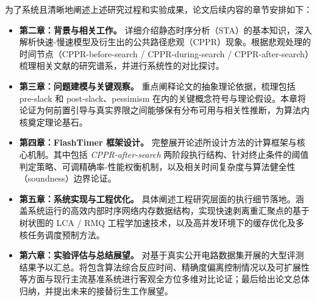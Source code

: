 为了系统且清晰地阐述上述研究过程和实验成果，论文后续内容的章节安排如下：
\begin{itemize}
    \item \textbf{第二章：背景与相关工作。} 详细介绍静态时序分析（STA）的基本知识，深入解析快速-慢速模型及衍生出的公共路径悲观（CPPR）现象。根据悲观处理的时间节点（CPPR-before-search / CPPR-during-search / CPPR-after-search）梳理相关文献的研究谱系，并进行系统性的对比探讨。
    \item \textbf{第三章：问题建模与关键观察。} 重点阐释论文的抽象理论依据，梳理包括 pre-slack 和 post-slack、pessimism 在内的关键概念符号与理论假设。本章将论证为何前置引导与真实界限之间能够保有分布可用与相关性推断，为算法内核奠定理论基石。
    \item \textbf{第四章：FlashTimer 框架设计。} 完整展开论述所设计方法的计算框架与核心机制。其中包括 \textit{CPPR-after-search} 两阶段执行结构、针对终止条件的阈值判定策略、可调精确率-性能权衡机制，以及相关时间复杂度与算法健全性（soundness）边界论证。
    \item \textbf{第五章：系统实现与工程优化。} 具体阐述工程研究层面的执行细节落地。涵盖系统运行的高效内部时序网络内存数据结构，实现快速剥离重汇聚点的基于树状图的 LCA / RMQ 工程学加速技术，以及高并发环境下的缓存优化及多核任务调度预制方法。
    \item \textbf{第六章：实验评估与总结展望。} 对基于真实公开电路数据集开展的大型评测结果予以汇总。将包含算法综合反应时间、精确度偏离控制情况以及可扩展性等方面与现行主流基准系统进行客观全方位多维对比论证；最后给出论文总体归纳，并提出未来的接替衍生工作展望。
\end{itemize}
